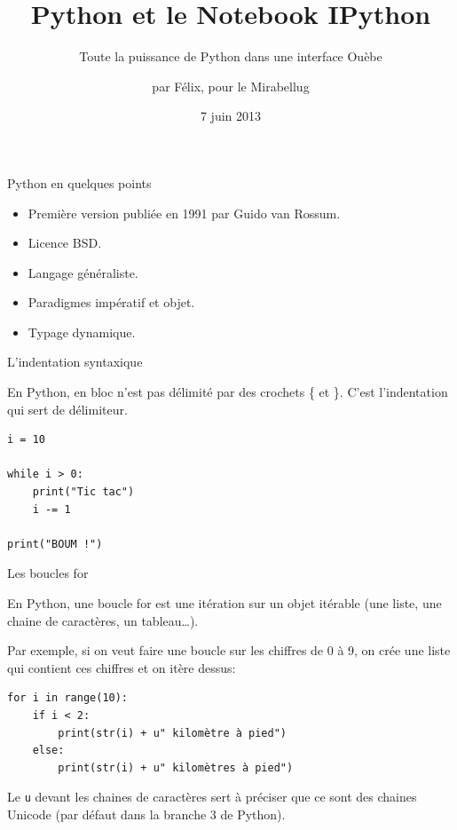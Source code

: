 \documentclass{beamer}
\title[Python, IPython, et le reste]{Python et le Notebook IPython}
\subtitle{Toute la puissance de Python dans une interface Ouèbe}
\author[Félix Hartmann]{par Félix, pour le Mirabellug}
\institute[Mirabellug]
{
}
\date{7 juin 2013}
\begin{document}
\begin{frame}
  \titlepage
\end{frame}


\begin{frame}{Python en quelques points}
	
	\begin{itemize}
		\item Première version publiée en 1991 par Guido van Rossum.
		\item Licence BSD.
		\item Langage généraliste.
		\item Paradigmes impératif et objet.
		\item Typage dynamique.
	\end{itemize}		
	
\end{frame}


\begin{frame}[fragile]{L'indentation syntaxique}

En Python, en bloc n'est pas délimité par des crochets \{ et \}. C'est 
l'indentation qui sert de délimiteur.

\begin{lstlisting}
i = 10

while i > 0:
    print("Tic tac")
    i -= 1

print("BOUM !")
\end{lstlisting}
	
\end{frame}


\begin{frame}[fragile]{Les boucles for}

En Python, une boucle for est une itération sur un objet itérable (une liste, 
une chaine de caractères, un tableau\dots).

\medskip

Par exemple, si on veut faire une boucle sur les chiffres de 0 à 9, on crée 
une liste qui contient ces chiffres et on itère dessus:

\begin{lstlisting}
for i in range(10):
    if i < 2:
        print(str(i) + u" kilomètre à pied")
    else:
        print(str(i) + u" kilomètres à pied")
\end{lstlisting}

Le \texttt{u} devant les chaines de caractères sert à préciser que ce sont des 
chaines Unicode (par défaut dans la branche 3 de Python).

\bigskip 
	
\end{frame}
\end{document}
